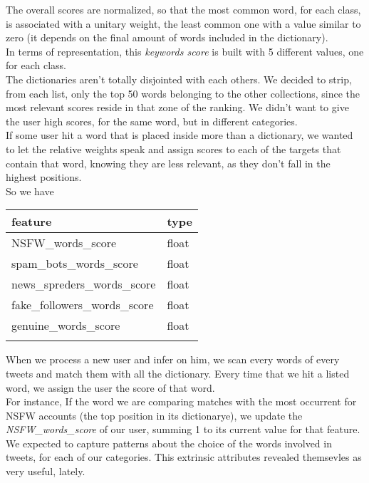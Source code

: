 \normalsize
The overall scores are normalized, so that the most common word, for each class, is associated with a unitary weight, the least common one with a value similar to zero (it depends on the final amount of words included in the dictionary).\\
In terms of representation, this \textit{keywords score} is built with 5 different values, one for each class.\\
The dictionaries aren't totally disjointed with each others.
We decided to strip, from each list, only the top 50 words belonging to the other collections, since the most relevant scores reside in that zone of the ranking. We didn't want to give the user high scores, for the same word, but in different categories.\\
If some user hit a word that is placed inside more than a dictionary, we wanted to let the relative weights speak and assign scores to each of the targets that contain that word, knowing they are less relevant, as they don't fall in the highest positions.\\
So we have

\small
\begin{center}
	\begin{tabular}{ll}
		\\feature&type\\
		\hline\hline
		NSFW\_words\_score&float\\
		spam\_bots\_words\_score&float\\
		news\_spreders\_words\_score&float\\
		fake\_followers\_words\_score&float\\
		genuine\_words\_score&float\\\hline\\
	\end{tabular}
\end{center}
\normalsize
When we process a new user and infer on him, we scan every words of every tweets and match them with all the dictionary. Every time that we hit a listed word, we assign the user the score of that word.\\
For instance, If the word we are comparing matches with the most occurrent for NSFW accounts (the top position in its dictionarye), we update the \textit{NSFW\_words\_score} of our user, summing 1 to its current value for that feature.
We expected to capture patterns about the choice of the words involved in tweets, for each of our categories.
This extrinsic attributes revealed themsevles as very useful, lately.


